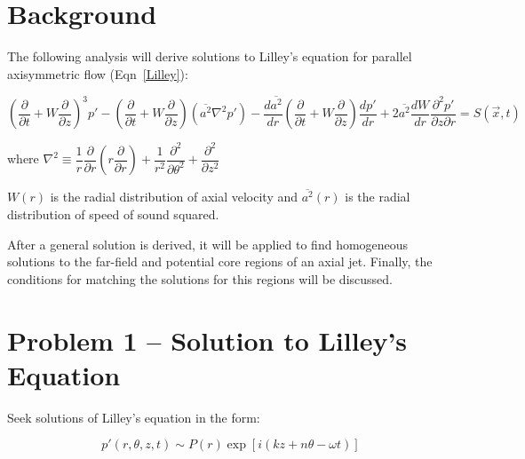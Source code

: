 \documentclass[]{aiaa-tc}%
\begin{document}
\section{Background} %

The following analysis will derive solutions to Lilley's equation for parallel axisymmetric flow (Eqn~\ref{Lilley}):

\begin{equation} \label{Lilley}
\left( \dfrac{\partial}{\partial t} + W \dfrac{\partial}{\partial z} \right)^3 p'
- \left( \dfrac{\partial}{\partial t} + W \dfrac{\partial}{\partial z} \right) \left( \overline{a^2} \nabla^2p' \right)
- \dfrac{d \overline{a^2}}{dr} \left( \dfrac{\partial}{\partial t} + W \dfrac{\partial}{\partial z} \right) \dfrac{dp'}{dr}
+ 2\overline{a^2} \dfrac{dW}{dr}\dfrac{\partial^2 p'}{\partial z \partial r}
= S(\vec{x}, t)
\end{equation}

\begin{center}
where $\nabla^2 \equiv \dfrac{1}{r}\dfrac{\partial}{\partial r} \left( r\dfrac{\partial}{\partial r} \right)
+ \dfrac{1}{r^2}\dfrac{\partial^2}{\partial \theta^2}
+ \dfrac{\partial^2}{\partial z^2}$
\end{center}


$W(r)$ is the radial distribution of axial velocity and $\overline{a^2}(r)$ is the radial distribution of speed of sound squared.

After a general solution is derived, it will be applied to find homogeneous solutions to the far-field and potential core regions of an axial jet.  Finally, the conditions for matching the solutions for this regions will be discussed.



\section{Problem 1 -- Solution to Lilley's Equation} \label{SecLilley}%

Seek solutions of Lilley's equation in the form:

\begin{equation} \label{SolnForm}
p'(r, \theta, z, t) \sim P(r) \exp\left[ i(kz + n\theta -\omega t) \right]
\end{equation}
\end{document}
